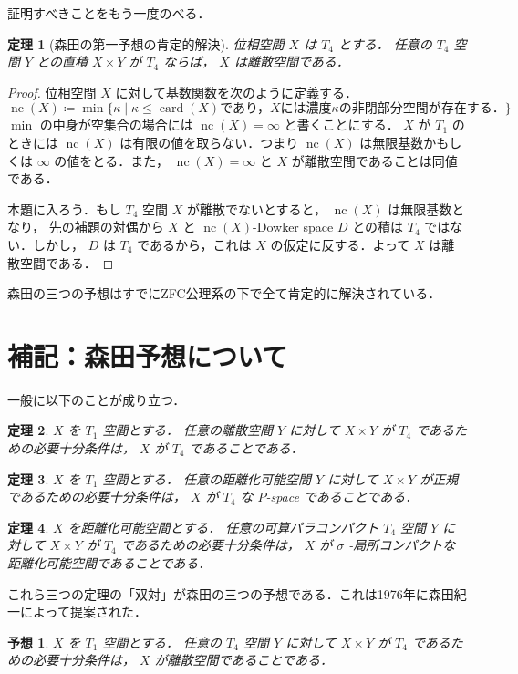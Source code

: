 \documentclass[leqno, 12pt]{ltjsarticle}
\newtheorem{thm}{定理}
\newtheorem{conj}{予想}
\DeclareMathOperator{\card}{card}
\DeclareMathOperator{\nc}{nc}
\begin{document}
証明すべきことをもう一度のべる．


\begin{thm}[森田の第一予想の肯定的解決]
位相空間
$X$
は
$T_{4}$
とする．
任意の
$T_{4}$
空間
$Y$
との直積
$X\times Y$
が
$T_{4}$
ならば，
$X$
は離散空間である．
\end{thm}
\begin{proof}
位相空間
$X$
に対して基数関数を次のように定義する．
\[
\nc(X)\coloneqq\min\{\kappa \mid \text{$\kappa\le \card(X)$であり，$X$には濃度$\kappa$の非閉部分空間が存在する．}\}
\]
$\min$
の中身が空集合の場合には
$\nc(X)=\infty$
と書くことにする．
$X$
が
$T_{1}$
のときには
$\nc(X)$
は有限の値を取らない．つまり
$\nc(X)$
は無限基数かもしくは
$\infty$
の値をとる．また，
$\nc(X)=\infty$
と
$X$
が離散空間であることは同値である．

本題に入ろう．もし
$T_{4}$
空間
$X$
が離散でないとすると，
$\nc(X)$
は無限基数となり，
先の補題の対偶から
$X$
と
$\nc(X)$-Dowker space
$D$
との積は
$T_{4}$
ではない．しかし，
$D$
は
$T_{4}$
であるから，これは
$X$
の仮定に反する．よって
$X$
は離散空間である．
\end{proof}

森田の三つの予想はすでにZFC公理系の下で全て肯定的に解決されている．

\section{補記：森田予想について}
一般に以下のことが成り立つ．
\begin{thm}
$X$
を
$T_{1}$
空間とする．
任意の離散空間
$Y$
に対して
$X\times Y$
が
$T_{4}$
であるための必要十分条件は，
$X$
が
$T_{4}$
であることである．
\end{thm}


\begin{thm}
$X$
を
$T_{1}$
空間とする．
任意の距離化可能空間
$Y$
に対して
$X\times Y$
が正規であるための必要十分条件は，
$X$
が
$T_{4}$
な
$P$-space
であることである．
\end{thm}

\begin{thm}
$X$
を距離化可能空間とする．
任意の可算パラコンパクト
$T_{4}$
空間
$Y$
に対して
$X\times Y$
が
$T_{4}$
であるための必要十分条件は，
$X$
が
$\sigma$
-局所コンパクトな距離化可能空間であることである．
\end{thm}

これら三つの定理の「双対」が森田の三つの予想である．これは1976年に森田紀一によって提案された．

\begin{conj}
$X$
を
$T_{1}$
空間とする．
任意の
$T_{4}$
空間
$Y$
に対して
$X\times Y$
が
$T_{4}$
であるための必要十分条件は，
$X$
が離散空間であることである．
\end{conj}
\end{document}
